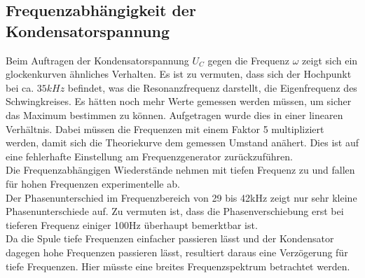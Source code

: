 \subsection{Frequenzabhängigkeit der Kondensatorspannung}
Beim Auftragen der Kondensatorspannung $U_C$ gegen die Frequenz $\omega$ zeigt sich 
ein glockenkurven ähnliches Verhalten.
Es ist zu vermuten, dass sich der Hochpunkt bei ca. $35kHz$ befindet, was die Resonanzfrequenz darstellt,
die Eigenfrequenz des Schwingkreises. Es hätten noch mehr Werte gemessen werden 
müssen, um sicher das Maximum bestimmen zu können.
Aufgetragen wurde dies in einer linearen Verhältnis.
Dabei müssen die Frequenzen mit einem Faktor 5 multipliziert werden, damit sich die
Theoriekurve dem gemessen Umstand anähert. Dies ist auf eine fehlerhafte Einstellung
am Frequenzgenerator zurückzuführen.
\\
Die Frequenzabhängigen Wiederstände nehmen mit tiefen Frequenz zu und fallen für hohen
Frequenzen experimentelle ab.
\\
Der Phasenunterschied im Frequenzbereich von 29 bis 42kHz zeigt nur sehr kleine 
Phasenunterschiede auf. Zu vermuten ist, dass die Phasenverschiebung erst bei tieferen
Frequenz einiger 100Hz überhaupt bemerktbar ist.\\
Da die Spule tiefe Frequenzen einfacher passieren lässt und der Kondensator dagegen
hohe Frequenzen passieren lässt, resultiert daraus eine Verzögerung für tiefe Frequenzen.
Hier müsste eine breites Frequenzspektrum betrachtet werden.  